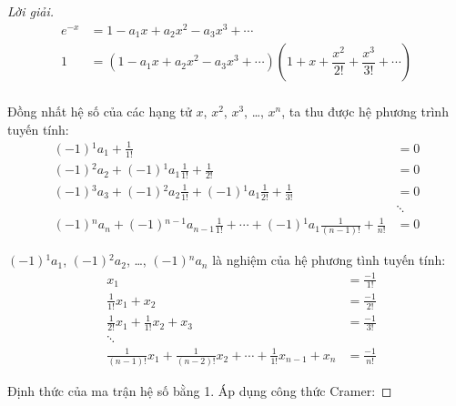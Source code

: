 \documentclass[class=nhvh-linear-algebra,crop=false]{standalone}
\begin{document}
\begin{proof}[Lời giải]
	\begingroup{}
	\allowdisplaybreaks{}
	\begin{align*}
		e^{-x} & = 1 - a_{1}x + a_{2}x^{2} - a_{3}x^{3} + \cdots                                                                      \\
		1      & = (1 - a_{1}x + a_{2}x^{2} - a_{3}x^{3} + \cdots)\left(1 + x + \dfrac{x^{2}}{2!} + \dfrac{x^{3}}{3!} + \cdots\right) \\
	\end{align*}
	\endgroup{}
	\par Đồng nhất hệ số của các hạng tử $x$, $x^{2}$, $x^{3}$, \ldots, $x^{n}$, ta thu được hệ phương trình tuyến tính:
	\begin{align*}
		(-1){}^{1}a_{1} + \frac{1}{1!}                                                                              & = 0    \\
		(-1){}^{2}a_{2} + (-1){}^{1}a_{1}\frac{1}{1!} + \frac{1}{2!}                                                & = 0    \\
		(-1){}^{3}a_{3} + (-1){}^{2}a_{2}\frac{1}{1!} + (-1){}^{1}a_{1}\frac{1}{2!} + \frac{1}{3!}                  & = 0    \\
		                                                                                                            & \ddots \\
		(-1){}^{n}a_{n} + (-1){}^{n-1}a_{n-1}\frac{1}{1!} + \cdots + (-1){}^{1}a_{1}\frac{1}{(n-1)!} + \frac{1}{n!} & = 0
	\end{align*}
	\par $(-1){}^{1}a_{1}$, $(-1){}^{2}a_{2}$, \ldots, $(-1){}^{n}a_{n}$ là nghiệm của hệ phương tình tuyến tính:
	\begin{align*}
		 & x_{1}                                                                                & = \frac{-1}{1!} \\
		 & \frac{1}{1!}x_{1} + x_{2}                                                            & = \frac{-1}{2!} \\
		 & \frac{1}{2!}x_{1} + \frac{1}{1!}x_{2} + x_{3}                                        & = \frac{-1}{3!} \\
		 & \ddots                                                                               &                 \\
		 & \frac{1}{(n-1)!}x_{1} + \frac{1}{(n-2)!}x_{2} + \cdots + \frac{1}{1!}x_{n-1} + x_{n} & = \frac{-1}{n!}
	\end{align*}
	\par Định thức của ma trận hệ số bằng 1. Áp dụng công thức Cramer:

\end{proof}
\end{document}
